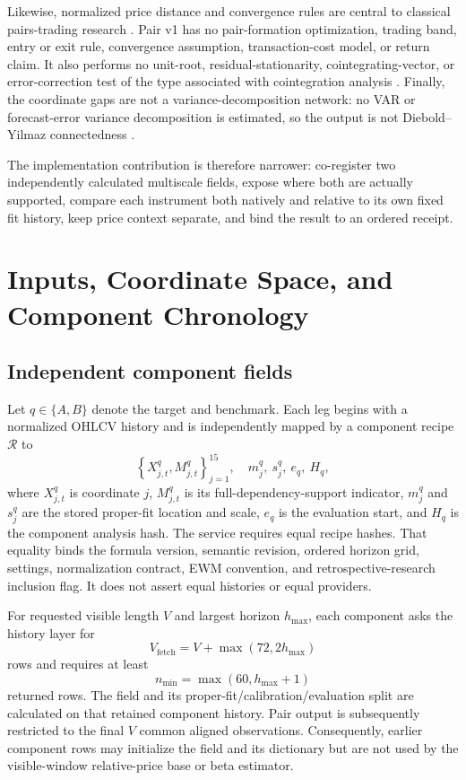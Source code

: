 \documentclass{article}
\begin{document}
Likewise, normalized price distance and convergence rules are central to classical pairs-trading research \citep{gatevetal2006pairs}. Pair v1 has no pair-formation optimization, trading band, entry or exit rule, convergence assumption, transaction-cost model, or return claim. It also performs no unit-root, residual-stationarity, cointegrating-vector, or error-correction test of the type associated with cointegration analysis \citep{englegranger1987cointegration}. Finally, the coordinate gaps are not a variance-decomposition network: no VAR or forecast-error variance decomposition is estimated, so the output is not Diebold--Yilmaz connectedness \citep{dieboldyilmaz2012spillovers}.

The implementation contribution is therefore narrower: co-register two independently calculated multiscale fields, expose where both are actually supported, compare each instrument both natively and relative to its own fixed fit history, keep price context separate, and bind the result to an ordered receipt.

\section{Inputs, Coordinate Space, and Component Chronology}

\subsection{Independent component fields}

Let $q\in\{A,B\}$ denote the target and benchmark. Each leg begins with a normalized OHLCV history and is independently mapped by a component recipe $\mathcal R$ to
\begin{equation}
    \left\{X^q_{j,t},M^q_{j,t}\right\}_{j=1}^{15},
    \quad
    m^q_j,\ s^q_j,\ e_q,\ H_q ,
\end{equation}
where $X^q_{j,t}$ is coordinate $j$, $M^q_{j,t}$ is its full-dependency-support indicator, $m^q_j$ and $s^q_j$ are the stored proper-fit location and scale, $e_q$ is the evaluation start, and $H_q$ is the component analysis hash. The service requires equal recipe hashes. That equality binds the formula version, semantic revision, ordered horizon grid, settings, normalization contract, EWM convention, and retrospective-research inclusion flag. It does not assert equal histories or equal providers.

For requested visible length $V$ and largest horizon $h_{\max}$, each component asks the history layer for
\begin{equation}
    V_{\mathrm{fetch}}=V+\max(72,2h_{\max})
\end{equation}
rows and requires at least
\begin{equation}
    n_{\min}=\max(60,h_{\max}+1)
\end{equation}
returned rows. The field and its proper-fit/calibration/evaluation split are calculated on that retained component history. Pair output is subsequently restricted to the final $V$ common aligned observations. Consequently, earlier component rows may initialize the field and its dictionary but are not used by the visible-window relative-price base or beta estimator.
\end{document}
